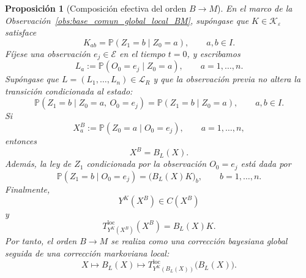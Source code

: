 ﻿\documentclass[12pt]{article}
\newtheorem{proposicion}{Proposición}[section]
\begin{document}
\begin{proposicion}[Composición efectiva del orden \(B\to M\)]
\label{prop:composicion_BM_kolmogorov}
En el marco de la Observación~\ref{obs:base_comun_global_local_BM}, supóngase que \(K\in\mathcal K_\varepsilon\) satisface
\[
K_{ab}
=
\mathbb P(Z_1=b\mid Z_0=a),
\qquad a,b\in I.
\]
Fíjese una observación \(e_j\in\mathcal E\) en el tiempo \(t=0\), y escribamos
\[
L_a
:=
\mathbb P(O_0=e_j\mid Z_0=a),
\qquad a=1,\dots,n.
\]
Supóngase que \(L=(L_1,\dots,L_n)\in\mathcal L_R\) y que la observación previa no altera la transición condicionada al estado:
\[
\mathbb P(Z_1=b\mid Z_0=a,\ O_0=e_j)
=
\mathbb P(Z_1=b\mid Z_0=a),
\qquad a,b\in I.
\]
Si
\[
X^B_a
:=
\mathbb P(Z_0=a\mid O_0=e_j),
\qquad a=1,\dots,n,
\]
entonces
\[
X^B=B_L(X).
\]
Además, la ley de \(Z_1\) condicionada por la observación \(O_0=e_j\) está dada por
\[
\mathbb P(Z_1=b\mid O_0=e_j)
=
\bigl(B_L(X)K\bigr)_b,
\qquad b=1,\dots,n.
\]
Finalmente,
\[
Y^K(X^B)\in C(X^B)
\]
y
\[
T^{\mathrm{loc}}_{Y^K(X^B)}(X^B)
=
B_L(X)K.
\]
Por tanto, el orden \(B\to M\) se realiza como una corrección bayesiana global seguida de una corrección markoviana local:
\[
X
\longmapsto
B_L(X)
\longmapsto
T^{\mathrm{loc}}_{Y^K(B_L(X))}
\bigl(B_L(X)\bigr).
\]
\end{proposicion}
\end{document}
